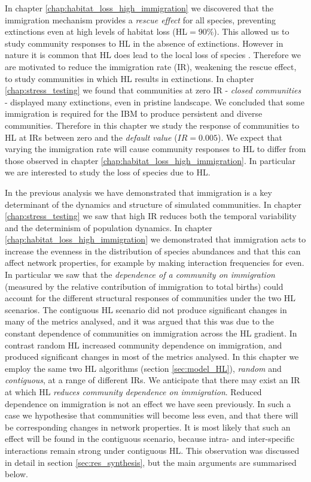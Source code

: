 In chapter \ref{chap:habitat_loss_high_immigration} we discovered that the immigration mechanism provides a \emph{rescue effect} for all species, preventing extinctions even at high levels of habitat loss (HL$=90\%$). This allowed us to study community responses to HL in the absence of extinctions. However in nature it is common that HL does lead to the local loss of species \cite{foley2005global}. Therefore we are motivated to reduce the immigration rate (IR), weakening the rescue effect, to study communities in which HL results in extinctions. In chapter \ref{chap:stress_testing} we found that communities at zero IR - \emph{closed communities} - displayed many extinctions, even in pristine landscape. We concluded that some immigration is required for the IBM to produce persistent and diverse communities. Therefore in this chapter we study the response of communities to HL at IRs between zero and the \emph{default value} ($IR=0.005$). We expect that varying the immigration rate will cause community responses to HL to differ from those observed in chapter \ref{chap:habitat_loss_high_immigration}. In particular we are interested to study the loss of species due to HL.

In the previous analysis we have demonstrated that immigration is a key determinant of the dynamics and structure of simulated communities. In chapter \ref{chap:stress_testing} we saw that high IR reduces both the temporal variability and the determinism of population dynamics. In chapter \ref{chap:habitat_loss_high_immigration} we demonstrated that immigration acts to increase the evenness in the distribution of species abundances and that this can affect network properties, for example by making interaction frequencies for even. In particular we saw that the \emph{dependence of a community on immigration} (measured by the relative contribution of immigration to total births) could account for the different structural responses of communities under the two HL scenarios. The contiguous HL scenario did not produce significant changes in many of the metrics analysed, and it was argued that this was due to the constant dependence of communities on immigration across the HL gradient. In contrast random HL increased community dependence on immigration, and produced significant changes in most of the metrics analysed. In this chapter we employ the same two HL algorithms (section \ref{sec:model_HL}), \emph{random} and \emph{contiguous}, at a range of different IRs. We anticipate that there may exist an IR at which HL \emph{reduces community dependence on immigration}. Reduced dependence on immigration is not an effect we have seen previously. In such a case we hypothesise that communities will become less even, and that there will be corresponding changes in network properties. It is most likely that such an effect will be found in the contiguous scenario, because intra- and inter-specific interactions remain strong under contiguous HL. This observation was discussed in detail in section \ref{sec:res_synthesis}, but the main arguments are summarised below.

